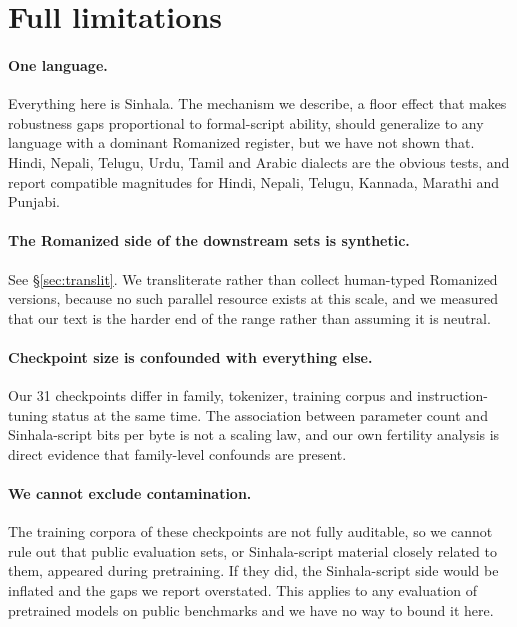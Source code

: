 \documentclass{article}
\begin{document}
\section{Full limitations}
\label{sec:limitfull}

\paragraph{One language.} Everything here is Sinhala. The mechanism we describe, a
floor effect that makes robustness gaps proportional to formal-script ability, should
generalize to any language with a dominant Romanized register, but we have not shown
that. Hindi, Nepali, Telugu, Urdu, Tamil and Arabic dialects are the obvious tests,
and \citet{khullar-etal-2025-scriptgap} report compatible magnitudes for Hindi,
Nepali, Telugu, Kannada, Marathi and Punjabi.

\paragraph{The Romanized side of the downstream sets is synthetic.} See
\S\ref{sec:translit}. We transliterate rather than collect human-typed Romanized
versions, because no such parallel resource exists at this scale, and we measured
that our text is the harder end of the range rather than assuming it is neutral.

\paragraph{Checkpoint size is confounded with everything else.} Our 31 checkpoints
differ in family, tokenizer, training corpus and instruction-tuning status at the
same time. The association between parameter count and Sinhala-script bits per byte
is not a scaling law, and our own fertility analysis is direct evidence that
family-level confounds are present.

\paragraph{We cannot exclude contamination.} The training corpora of these
checkpoints are not fully auditable, so we cannot rule out that public evaluation
sets, or Sinhala-script material closely related to them, appeared during
pretraining. If they did, the Sinhala-script side would be inflated and the gaps we
report overstated. This applies to any evaluation of pretrained models on public
benchmarks and we have no way to bound it here.
\end{document}
